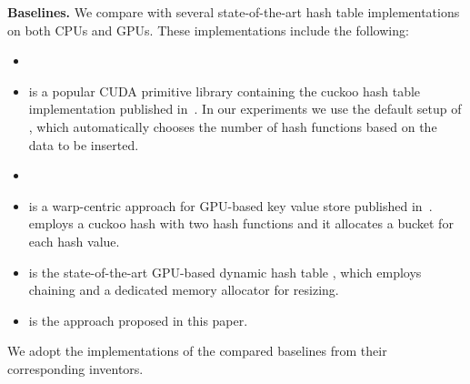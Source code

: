 \vspace{1mm}\noindent\textbf{Baselines.} We compare \voter with several state-of-the-art hash table implementations on both CPUs and GPUs. These implementations include the following:
\begin{itemize}
	\item {}
	\item \cudpp is a popular CUDA primitive library containing the cuckoo hash table implementation published in~\cite{alcantara2009real}.  
	In our experiments we use the default setup of \cudpp, which automatically chooses the number of hash functions based on the data to be inserted.
	\item {}
	\item \megakv is a warp-centric approach for GPU-based key value store published in~\cite{zhang2015mega}. \megakv employs a cuckoo hash with two hash functions and
	it allocates a bucket for each hash value. 
	\item \slab is the state-of-the-art GPU-based dynamic hash table \cite{ashkiani2018dynamic}, which employs chaining and a dedicated memory allocator for resizing.
	\item \voter is the approach proposed in this paper. 
\end{itemize}
We adopt the implementations of the compared baselines from their corresponding inventors.

